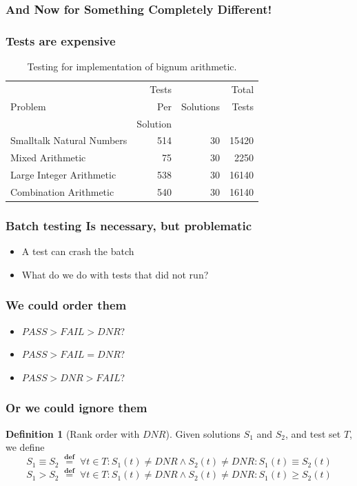 \documentclass[svgnames]{beamer}
\newcommand\dnr{\ensuremath{\mathit{DNR}}}
\newcommand\fail{\mathit{FAIL}}
\newcommand\pass{\mathit{PASS}}
\newcommand\defined{\mathrel{\;\stackrel{\scriptscriptstyle\mathbf{def}}{=}\;}}
\theoremstyle{definition}
\newtheorem{defn}{Definition}
\begin{document}
\begin{frame}
\frametitle{And Now for Something Completely Different!}
\end{frame}

\begin{frame}
\frametitle{Tests are expensive}
\begin{table}
\begin{tabular}{| l | r | r | r |}
\hline
 & Tests & & Total \\
Problem & Per & Solutions & Tests \\
 & Solution & &  \\
\hline
Smalltalk Natural Numbers & 514 & 30 & 15420 \\
Mixed Arithmetic & 75 & 30 & 2250 \\
Large Integer Arithmetic & 538 & 30 & 16140 \\
Combination Arithmetic & 540 & 30 & 16140 \\
\hline
\end{tabular}
\caption{Testing for implementation of bignum arithmetic.}
\end{table}
\end{frame}

\begin{frame}
\frametitle{Batch testing Is necessary, but problematic}
\begin{itemize}
\item A test can crash the batch
\item What do we do with tests that did not run?
\end{itemize}
\end{frame}

\begin{frame}
\frametitle{We could order them}
\begin{itemize}
\item $\pass>\fail>\dnr$?
\item $\pass>\fail=\dnr$?
\item $\pass>\dnr>\fail$?
\end{itemize}
\end{frame}

\begin{frame}
\frametitle{Or we could ignore them}
\begin{defn}[Rank order with \dnr]
Given solutions $S_1$ and $S_2$, and test set $T$, we define
$$S_1 \equiv S_2 \defined \forall t \in T : S_1(t) \neq \dnr \wedge S_2(t) \neq \dnr : S_1(t) \equiv S_2(t)$$
$$S_1 > S_2 \defined \forall t \in T : S_1(t) \neq \dnr \wedge S_2(t) \neq \dnr : S_1(t) \geq S_2(t)$$
\end{defn}
\end{frame}
\end{document}
